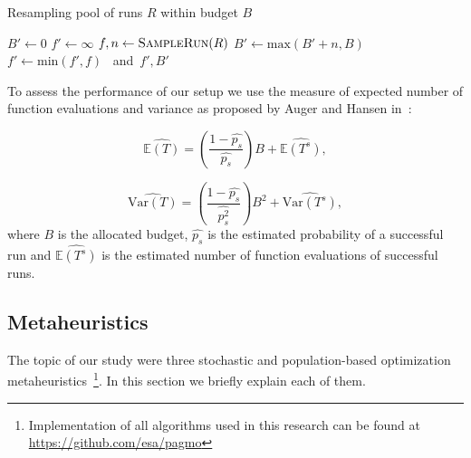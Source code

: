 \documentclass{sig-alternate}
\begin{document}
    \begin{algorithm}
    \caption{Resampling pool of runs $R$ within budget $B$}
    \label{alg:resample}
    \begin{algorithmic}[1]
        \State $B' \gets 0$
        \State $f' \gets \infty$
        \Do
            \State $f, n \gets \Call{SampleRun}{R}$%
            \State $B' \gets \mbox{max}(B' + n, B)$
            \State $f' \gets \mbox{min}(f', f)$
        \EndFunction \mbox{ and }\Return $f', B'$
    \end{algorithmic}
    \end{algorithm}

    To assess the performance of our setup we use the measure of expected number of function evaluations and variance as proposed by Auger and Hansen in~\cite{Hansen05performanceevaluation}:

    \begin{equation}
        \widehat{\mathbb{E}(T)} = \left(\dfrac{1 - \widehat{p_s}}{\widehat{p_s}}\right) B + \widehat{\mathbb{E}(T^s)},
        \label{eq:ert}
    \end{equation}

    \begin{equation}
        \widehat{\mbox{Var}(T)} = \left(\dfrac{1 - \widehat{p_s}}{\widehat{p_s^2}}\right) B^2 + \widehat{\mbox{Var}(T^s)},
        \label{eq:var}
    \end{equation}
    where $B$ is the allocated budget, $\widehat{p_s}$ is the estimated probability of a successful run and $\widehat{\mathbb{E}(T^s)}$ is the estimated number of function evaluations of successful runs.

\subsection{Metaheuristics}
    The topic of our study were three stochastic and population-based optimization metaheuristics~\footnote{Implementation of all algorithms used in this research can be found at \url{https://github.com/esa/pagmo}}.
    In this section we briefly explain each of them.%
\end{document}
